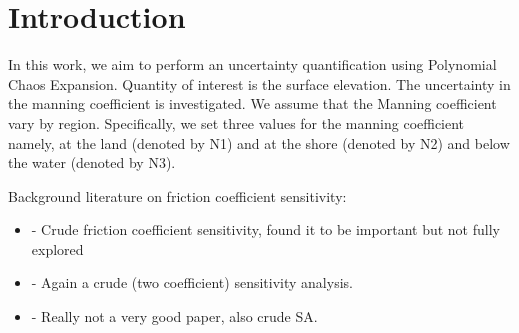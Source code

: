 
\section{Introduction} 

In this work, we aim to perform an uncertainty quantification
using Polynomial Chaos Expansion. Quantity of interest is the surface elevation.
The uncertainty in the manning coefficient is investigated.
We assume that the Manning coefficient vary by region. Specifically,
we set three values for the manning coefficient namely, at the land (denoted by N1)
and at the shore (denoted by N2) and below the water (denoted by N3).


\cite{sraj:2013a}
\cite{sraj:2013b}

Background literature on friction coefficient sensitivity:
\begin{itemize}
    \item \cite{Myers:2001el} - Crude friction coefficient sensitivity, found it to be important but not fully explored
    \item \cite{Jakeman:2010hk} - Again a crude (two coefficient) sensitivity analysis.
    \item \cite{Dao:2007hr} - Really not a very good paper, also crude SA.
\end{itemize}